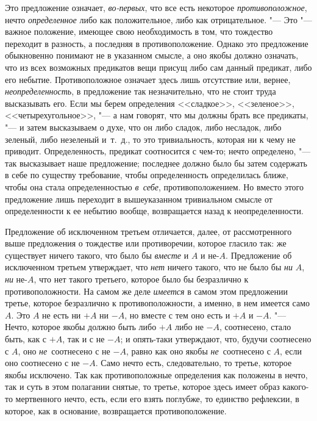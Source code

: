 Это предложение означает, {\em во-первых}, что все есть
некоторое {\em противоположное}, нечто
{\em определенное} либо как положительное, либо как
отрицательное. "--- Это "--- важное положение, имеющее свою необходимость в
том, что тождество переходит в разность, а последняя в противоположение.
Однако это предложение обыкновенно понимают не в указанном смысле, а оно якобы
должно означать, что из всех возможных предикатов вещи присущ либо сам
данный предикат, либо его небытие. Противоположное означает здесь лишь
отсутствие или, вернее, {\em неопределенность}, в
предложение так незначительно, что не стоит труда высказывать его. Если мы
берем определения <<сладкое>>, <<зеленое>>, <<четырехугольное>>, "--- а нам
говорят, что мы должны брать все предикаты, "--- и затем высказываем о духе,
что он либо сладок, либо несладок, либо зеленый, либо незеленый и~т.~д., то
это тривиальность, которая ни к чему не приводит. Определенность, предикат
соотносится с чем-то; нечто определено, "--- так высказывает наше предложение;
последнее должно было бы затем содержать в себе по существу требование,
чтобы определенность определилась ближе, чтобы она стала определенностью
{\em в~себе}, противоположением. Но вместо этого
предложение лишь переходит в вышеуказанном тривиальном смысле от
определенности к ее небытию вообще, возвращается назад к неопределенности.

Предложение об исключенном третьем отличается, далее, от рассмотренного выше
предложения о тождестве или противоречии, которое гласило так: же
существует ничего такого, что было бы {\em вместе} и
$A$ и не-$A$. Предложение об исключенном третьем утверждает,
что {\em нет} ничего такого, что не было бы {\em ни} $A$, {\em ни} не-$A$,
что нет такого третьего, которое было бы безразлично к
противоположности. На самом же деле {\em имеется} в
самом этом предложении третье, которое безразлично к противоположности, а
именно, в нем имеется само $A$. Это $A$ не есть ни
$+A$ ни $-A$, но вместе с тем оно есть и $+A$ и
$-A$. "--- Нечто, которое якобы должно быть либо $+A$ либо
не $-A$, соотнесено, стало быть, как с $+A$, так и с
не $-A$; и опять-таки утверждают, что, будучи соотнесено с
$A$, оно {\em не}~соотнесено с не $-A$,
равно как оно якобы {\em не}~соотнесено с $A$,
если оно соотнесено с не $-A$. Само нечто есть, следовательно, то
третье, которое якобы исключено. Так как противоположные определения как
положены в нечто, так и суть в этом полагании снятые, то третье, которое
здесь имеет образ какого-то мертвенного нечто, есть, если его взять
поглубже, то единство рефлексии, в которое, как в основание, возвращается
противоположение.


